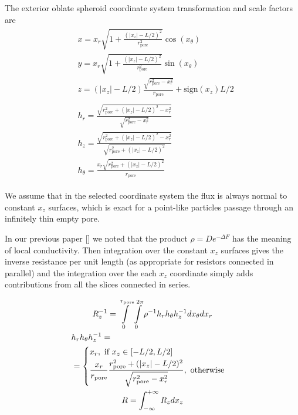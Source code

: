 \documentclass[10pt, a4paper]{article}
\newcommand{\sign}{\text{sign}}
\begin{document}
\begin{multicols}{2}
The exterior oblate spheroid coordinate system transformation and scale factors are
\begin{gather}
    \begin{aligned}\label{eq:oblate_spheroid_transformation_1}
        &x = x_r
        \sqrt{1+\frac{(|x_z|-L/2)^2}{r_{\textrm{pore}}^2}}
        \cos(x_{\theta})
        \\
        &y = x_r
        \sqrt{1+\frac{(|x_z|-L/2)^2}{r_{\textrm{pore}}^2}}
        \sin(x_{\theta})
        \\
        &z = (|x_z|-L/2) \frac{\sqrt{r_{\textrm{pore}}^2 - x_r^2}}{r_{\textrm{pore}}} + \sign(x_z) L/2 
    \end{aligned}
    \\[4pt]
    \begin{aligned}\label{eq:oblate_spheroid_transformation_2}
        &h_r = \frac{\sqrt{r_{\textrm{pore}}^2 + (|x_z|-L/2)^2 - x_r^2}}{\sqrt{r_{\textrm{pore}}^2 - x_r^2}}
        \\
        &h_z = \frac{\sqrt{r_{\textrm{pore}}^2 + (|x_z|-L/2)^2 - x_r^2}}{\sqrt{r_{\textrm{pore}}^2 + (|x_z|-L/2)^2}}
        \\
        &h_{\theta} = \frac{x_r \sqrt{r_{\textrm{pore}}^2 + (|x_z|-L/2)^2}}{r_{\textrm{pore}}}
    \end{aligned}
\end{gather}

We assume that in the selected coordinate system the flux is always normal to constant $x_z$ surfaces, which is exact for a point-like particles passage through an infinitely thin empty pore.

In our previous paper [] we noted that the product $\rho = D e^{-\Delta F}$ has the meaning of local conductivity. Then integration over the constant $x_z$ surfaces gives the inverse resistance per unit length (as appropriate for resistors connected in parallel) and the integration over the each $x_z$ coordinate simply adds contributions from all the slices connected in series.

\begin{gather}
    \label{eq:R_z_analyt}
    R_z^{-1} = \int\displaylimits_{0}^{r_{\textrm{pore}}} \int\displaylimits_{0}^{2\pi} \rho^{-1} h_r h_{\theta} h_z^{-1} dx_{\theta} dx_r
    \\
    \label{eq:h_integrand}
    \begin{aligned} 
        &h_r h_{\theta} h_z^{-1} = \\ &=
        \begin{cases}
            x_r, \textrm{ if } x_z \in [-L/2,L/2]
            \\[2pt]
            \dfrac{x_r}{r_{\textrm{pore}}}\dfrac{r_{\textrm{pore}}^2 + (|x_z|-L/2)^2}{\sqrt{r_{\textrm{pore}}^2 - x_r^2}}, \textrm{ otherwise}
        \end{cases}
    \end{aligned}
    \\
    \label{eq:R_analyt}
    R = \int_{-\infty}^{+\infty} R_z dx_z
\end{gather}


\end{multicols}
\end{document}
